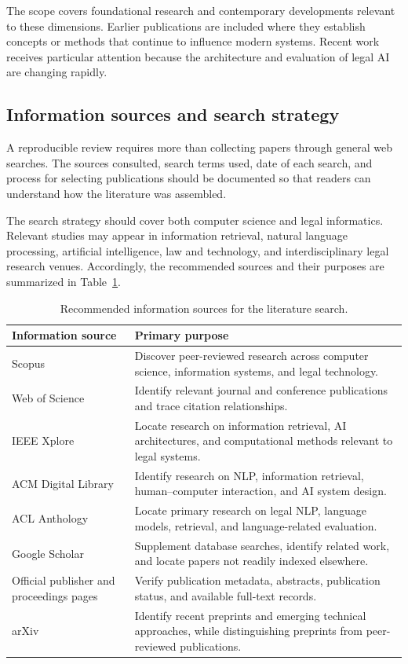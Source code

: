 The scope covers foundational research and contemporary developments relevant to these dimensions.
Earlier publications are included where they establish concepts or methods that continue to
influence modern systems. Recent work receives particular attention because the architecture and
evaluation of legal AI are changing rapidly.

\subsection{Information sources and search strategy}

A reproducible review requires more than collecting papers through general web searches. The
sources consulted, search terms used, date of each search, and process for selecting publications
should be documented so that readers can understand how the literature was assembled.

The search strategy should cover both computer science and legal informatics. Relevant studies may
appear in information retrieval, natural language processing, artificial intelligence, law and
technology, and interdisciplinary legal research venues. Accordingly, the recommended sources and
their purposes are summarized in Table~\ref{tab:sources}.

\begin{table}[t]
\centering
\caption{Recommended information sources for the literature search.}
\label{tab:sources}
\footnotesize
\setlength{\tabcolsep}{6pt}
\renewcommand{\arraystretch}{1.25}
\begin{tabularx}{\textwidth}{>{\raggedright\arraybackslash}p{4.2cm} >{\raggedright\arraybackslash}X}
\toprule
\textbf{Information source} & \textbf{Primary purpose} \\
\midrule
Scopus & Discover peer-reviewed research across computer science, information systems, and legal technology. \\
Web of Science & Identify relevant journal and conference publications and trace citation relationships. \\
IEEE Xplore & Locate research on information retrieval, AI architectures, and computational methods relevant to legal systems. \\
ACM Digital Library & Identify research on NLP, information retrieval, human--computer interaction, and AI system design. \\
ACL Anthology & Locate primary research on legal NLP, language models, retrieval, and language-related evaluation. \\
Google Scholar & Supplement database searches, identify related work, and locate papers not readily indexed elsewhere. \\
Official publisher and proceedings pages & Verify publication metadata, abstracts, publication status, and available full-text records. \\
arXiv & Identify recent preprints and emerging technical approaches, while distinguishing preprints from peer-reviewed publications. \\
\bottomrule
\end{tabularx}
\end{table}

